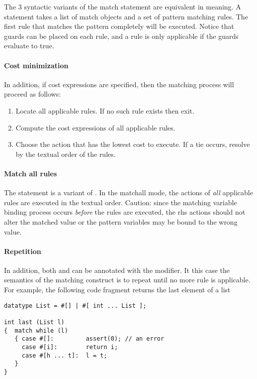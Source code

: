 The 3 syntactic variants of the match statement are equivalent in meaning.
A  statement takes a list of match objects and a
set of pattern matching rules.  The first rule that matches the pattern
completely will be executed.  Notice that guards can be placed on each rule,
and a rule is only applicable if the guards evaluate to true. 

\paragraph{Cost minimization}
In addition, if cost expressions are specified, then the matching process
will proceed as follows: 
\begin{enumerate}
   \item Locate all applicable rules.  If no such rule exists then exit.
   \item Compute the cost expressions of all applicable rules.
   \item Choose the action that has the lowest cost to execute.  If
a tie occurs, resolve by the textual order of the rules. 
\end{enumerate}

\paragraph{Match all rules}
The  statement is a variant of .  In the matchall
mode, the actions of {\em all} applicable rules are executed in the
textual order.  Caution: since the matching variable binding 
process occurs {\em before} the rules are executed, the rhs actions
should not alter the matched value or the pattern variables may
be bound to the wrong value.

\paragraph{Repetition} 
In addition, both  and  can be annotated with the
 modifier.  It this case the semantics of the matching
construct is to repeat until no more rule is applicable.  For example,
the following code fragment returns the last element of a list
\begin{verbatim}
datatype List = #[] | #[ int ... List ];

int last (List l)
{  match while (l)
   { case #[]:         assert(0); // an error
     case #[i]:        return i;
     case #[h ... t]:  l = t;     
   }
}
\end{verbatim}

